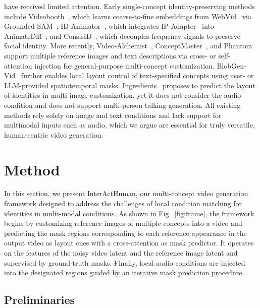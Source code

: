 \documentclass{article} %
\begin{document}
 have received limited attention. Early single-concept identity-preserving methods include Videobooth~\citep{jiang2024videobooth}, which learns coarse-to-fine embeddings from WebVid~\citep{bain2021frozen} via Grounded-SAM~\citep{kirillov2023segment, liu2023grounding, ren2024grounded}; ID-Animator~\citep{he2024id}, which integrates IP-Adapter~\citep{ye2023ip} into AnimateDiff~\citep{guo2024animatediff}; and ConsisID~\citep{yuan2024identity}, which decouples frequency signals to preserve facial identity. More recently, Video-Alchemist~\citep{chen2025multi}, ConceptMaster~\citep{huang2025conceptmaster}, and Phantom~\citep{liu2025phantom} support multiple reference images and text descriptions via cross- or self-attention injection for general-purpose multi-concept customization. BlobGen-Vid~\citep{feng2025blobgen} further enables local layout control of text-specified concepts using user- or LLM-provided spatiotemporal masks. Ingredients~\citep{fei2025ingredients} proposes to predict the layout of identities in multi-image customization, yet it does not consider the audio condition and does not support multi-person talking generation. All existing methods rely solely on image and text conditions and lack support for multimodal inputs such as audio, which we argue are essential for truly versatile, human-centric video generation.

\section{Method}
In this section, we present InterActHuman, our multi-concept video generation framework designed to address the challenges of local condition matching for identities in multi-modal conditions. As shown in Fig.~\ref{fig:frame}, the framework begins by customizing reference images of multiple concepts into a video and predicting the mask regions corresponding to each reference appearance in the output video as layout cues with a cross-attention as mask predictor. It operates on the features of the noisy video latent and the reference image latent and supervised by ground-truth masks. Finally, local audio conditions are injected into the designated regions guided by an iterative mask prediction procedure.

\subsection{Preliminaries}
\label{sec:setting}
\end{document}
